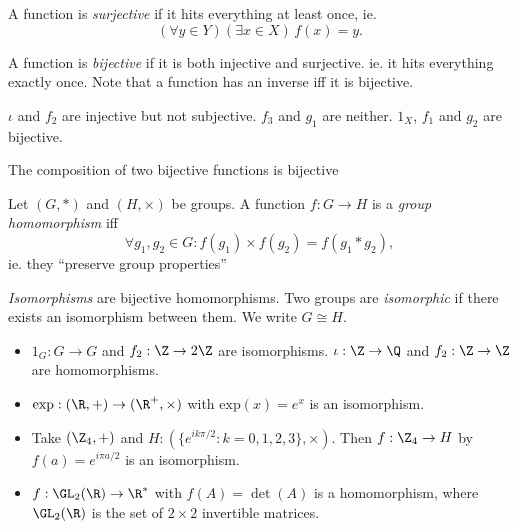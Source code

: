 \documentclass[a4paper]{article}
\begin{document}
\begin{defi}
  A function is \emph{surjective} if it hits everything at least once, ie.
  \[
    (\forall y\in Y)(\exists x\in X)\,f(x) = y.
  \]
\end{defi}

\begin{defi}
  A function is \emph{bijective} if it is both injective and surjective. ie. it hits everything exactly once. Note that a function has an inverse iff it is bijective.
\end{defi}

\begin{eg}
  $\iota$ and $f_2$ are injective but not subjective. $f_3$ and $g_1$ are neither. $1_X$, $f_1$ and $g_2$ are bijective.
\end{eg}

\begin{lemma}
  The composition of two bijective functions is bijective
\end{lemma}

\begin{defi}
  Let $(G, *)$ and $(H, \times)$ be groups. A function $f:G\rightarrow H$ is a \emph{group homomorphism} iff
  \[
    \forall g_1, g_2 \in G: f(g_1)\times f(g_2) = f(g_1 * g_2),
  \]
  ie. they ``preserve group properties''
\end{defi}

\begin{defi}
  \emph{Isomorphisms} are bijective homomorphisms. Two groups are \emph{isomorphic} if there exists an isomorphism between them. We write $G\cong H$.
\end{defi}

\begin{eg}\leavevmode
  \begin{itemize}
    \item $1_G: G \rightarrow G$ and $f_2: \Z \rightarrow 2\Z$  are isomorphisms. $\iota: \Z\rightarrow\Q$ and $f_2:\Z\rightarrow\Z$ are homomorphisms.
    \item $\mathrm{exp}: (\R, +) \rightarrow (\R^+, \times)$ with $\mathrm{exp}(x) = e^x$ is an isomorphism.
    \item Take $(\Z_4, +)$ and $H: (\{e^{ik\pi/2}:k=0, 1 ,2, 3\}, \times)$. Then $f: \Z_4 \rightarrow H$  by $f(a) = e^{i\pi a/2}$ is an isomorphism.
    \item $f: \GL_2(\R) \rightarrow \R^*$ with $f(A) = \det(A)$ is a homomorphism, where $\GL_2(\R)$ is the set of $2\times 2$ invertible matrices.
  \end{itemize}
\end{eg}
\end{document}
